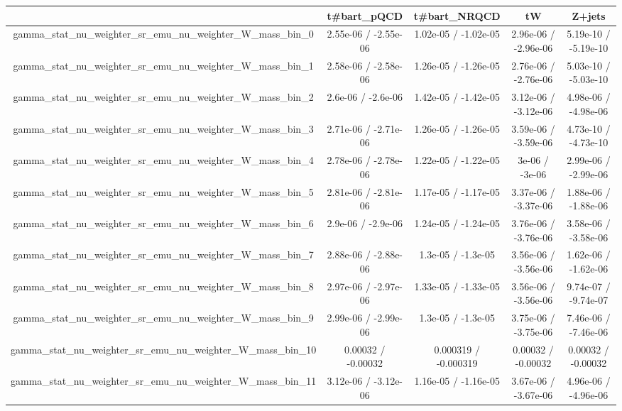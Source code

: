 \documentclass[10pt]{article}
\begin{document}
\begin{table}[htbp]
\begin{center}
\begin{tabular}{|c|c|c|c|c|}
\hline 
      & t#bar{t}_{pQCD}      & t#bar{t}_{NRQCD}      & tW      & Z+jets \\ 
\hline 
  gamma_stat_nu_weighter_sr_emu_nu_weighter_W_mass_bin_0 & 2.55e-06 / -2.55e-06 & 1.02e-05 / -1.02e-05 & 2.96e-06 / -2.96e-06 & 5.19e-10 / -5.19e-10 \\ 
  gamma_stat_nu_weighter_sr_emu_nu_weighter_W_mass_bin_1 & 2.58e-06 / -2.58e-06 & 1.26e-05 / -1.26e-05 & 2.76e-06 / -2.76e-06 & 5.03e-10 / -5.03e-10 \\ 
  gamma_stat_nu_weighter_sr_emu_nu_weighter_W_mass_bin_2 & 2.6e-06 / -2.6e-06 & 1.42e-05 / -1.42e-05 & 3.12e-06 / -3.12e-06 & 4.98e-06 / -4.98e-06 \\ 
  gamma_stat_nu_weighter_sr_emu_nu_weighter_W_mass_bin_3 & 2.71e-06 / -2.71e-06 & 1.26e-05 / -1.26e-05 & 3.59e-06 / -3.59e-06 & 4.73e-10 / -4.73e-10 \\ 
  gamma_stat_nu_weighter_sr_emu_nu_weighter_W_mass_bin_4 & 2.78e-06 / -2.78e-06 & 1.22e-05 / -1.22e-05 & 3e-06 / -3e-06 & 2.99e-06 / -2.99e-06 \\ 
  gamma_stat_nu_weighter_sr_emu_nu_weighter_W_mass_bin_5 & 2.81e-06 / -2.81e-06 & 1.17e-05 / -1.17e-05 & 3.37e-06 / -3.37e-06 & 1.88e-06 / -1.88e-06 \\ 
  gamma_stat_nu_weighter_sr_emu_nu_weighter_W_mass_bin_6 & 2.9e-06 / -2.9e-06 & 1.24e-05 / -1.24e-05 & 3.76e-06 / -3.76e-06 & 3.58e-06 / -3.58e-06 \\ 
  gamma_stat_nu_weighter_sr_emu_nu_weighter_W_mass_bin_7 & 2.88e-06 / -2.88e-06 & 1.3e-05 / -1.3e-05 & 3.56e-06 / -3.56e-06 & 1.62e-06 / -1.62e-06 \\ 
  gamma_stat_nu_weighter_sr_emu_nu_weighter_W_mass_bin_8 & 2.97e-06 / -2.97e-06 & 1.33e-05 / -1.33e-05 & 3.56e-06 / -3.56e-06 & 9.74e-07 / -9.74e-07 \\ 
  gamma_stat_nu_weighter_sr_emu_nu_weighter_W_mass_bin_9 & 2.99e-06 / -2.99e-06 & 1.3e-05 / -1.3e-05 & 3.75e-06 / -3.75e-06 & 7.46e-06 / -7.46e-06 \\ 
  gamma_stat_nu_weighter_sr_emu_nu_weighter_W_mass_bin_10 & 0.00032 / -0.00032 & 0.000319 / -0.000319 & 0.00032 / -0.00032 & 0.00032 / -0.00032 \\ 
  gamma_stat_nu_weighter_sr_emu_nu_weighter_W_mass_bin_11 & 3.12e-06 / -3.12e-06 & 1.16e-05 / -1.16e-05 & 3.67e-06 / -3.67e-06 & 4.96e-06 / -4.96e-06 \\ 

\end{tabular}
\end{center}
\end{table}
\end{document}

